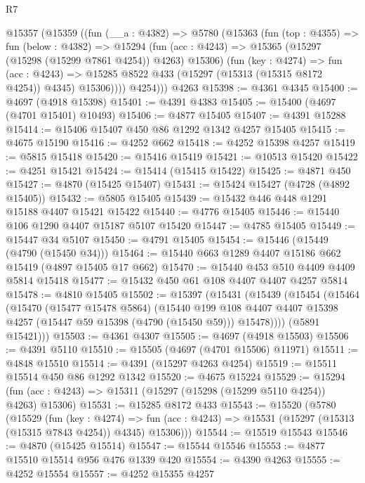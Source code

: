 \begin{lexlean}{R7}
\begin{coremodule}
    @15357
      (@15359
        ((fun (__a : @4382) =>
        @5780
          (@15363
            (fun (top : @4355) =>
            fun (below : @4382) =>
            @15294
              (fun (acc : @4243) => @15365 (@15297 (@15298 (@15299 @7861 @4254)) @4263) @15306)
              (fun (key : @4274) =>
              fun (acc : @4243) =>
              @15285 @8522 @433 (@15297 (@15313 (@15315 @8172 @4254)) @4345) @15306))))
          @4254)))
    @4263
@15398 := @4361 @4345
@15400 := @4697 (@4918 @15398)
@15401 := @4391 @4383
@15405 := @15400 (@4697 (@4701 @15401) @10493)
@15406 := @4877 @15405
@15407 := @4391 @15288
@15414 := @15406 @15407 @450 @86 @1292 @1342 @4257 @15405
@15415 := @4675 @15190
@15416 := @4252 @662
@15418 := @4252 @15398 @4257
@15419 := @5815 @15418
@15420 := @15416 @15419
@15421 := @10513 @15420
@15422 := @4251 @15421
@15424 := @15414 (@15415 @15422)
@15425 := @4871 @450
@15427 := @4870 (@15425 @15407)
@15431 := @15424 @15427 (@4728 (@4892 @15405))
@15432 := @5805 @15405
@15439 := @15432 @446 @448 @1291 @15188 @4407 @15421 @15422
@15440 := @4776 @15405
@15446 := @15440 @106 @1290 @4407 @15187 @5107 @15420
@15447 := @4785 @15405
@15449 := @15447 @34 @5107
@15450 := @4791 @15405
@15454 := @15446 (@15449 (@4790 (@15450 @34)))
@15464 := @15440 @663 @1289 @4407 @15186 @662 @15419 (@4897 @15405 @17 @662)
@15470 := @15440 @453 @510 @4409 @4409 @5814 @15418
@15477 := @15432 @450 @61 @108 @4407 @4407 @4257 @5814
@15478 := @4810 @15405
@15502 := @15397
    (@15431
      (@15439
        (@15454
          (@15464
            (@15470
              (@15477 @15478 @5864)
              (@15440
                @199
                @108
                @4407
                @4407
                @15398
                @4257
                (@15447 @59 @15398 (@4790 (@15450 @59)))
                @15478))))
        (@5891 @15421)))
@15503 := @4361 @4307
@15505 := @4697 (@4918 @15503)
@15506 := @4391 @5110
@15510 := @15505 (@4697 (@4701 @15506) @11971)
@15511 := @4848 @15510
@15514 := @4391 (@15297 @4263 @4254)
@15519 := @15511 @15514 @450 @86 @1292 @1342
@15520 := @4675 @15224
@15529 := @15294 (fun (acc : @4243) => @15311 (@15297 (@15298 (@15299 @5110 @4254)) @4263) @15306)
@15531 := @15285 @8172 @433
@15543 := @15520
    (@5780
      (@15529
        (fun (key : @4274) =>
        fun (acc : @4243) => @15531 (@15297 (@15313 (@15315 @7843 @4254)) @4345) @15306)))
@15544 := @15519 @15543
@15546 := @4870 (@15425 @15514)
@15547 := @15544 @15546
@15553 := @4877 @15510 @15514 @956 @476 @1339 @420
@15554 := @4390 @4263
@15555 := @4252 @15554
@15557 := @4252 @15355 @4257

\end{coremodule}
\end{lexlean}
